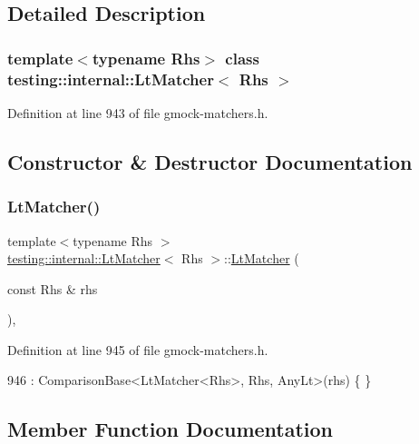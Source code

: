 \subsection{Detailed Description}
\subsubsection*{template$<$typename Rhs$>$\newline
class testing\+::internal\+::\+Lt\+Matcher$<$ Rhs $>$}



Definition at line 943 of file gmock-\/matchers.\+h.



\subsection{Constructor \& Destructor Documentation}
\mbox{\label{classtesting_1_1internal_1_1LtMatcher_af5275d78fc5499e4757f1b3ecca67e15}} 
\subsubsection{\texorpdfstring{Lt\+Matcher()}{LtMatcher()}}
{\footnotesize\ttfamily template$<$typename Rhs $>$ \\
\hyperlink{classtesting_1_1internal_1_1LtMatcher}{testing\+::internal\+::\+Lt\+Matcher}$<$ Rhs $>$\+::\hyperlink{classtesting_1_1internal_1_1LtMatcher}{Lt\+Matcher} (\begin{DoxyParamCaption}\item[{const Rhs \&}]{rhs }\end{DoxyParamCaption})\hspace{0.3cm}{\ttfamily [inline]}, {\ttfamily [explicit]}}



Definition at line 945 of file gmock-\/matchers.\+h.


\begin{DoxyCode}
946       : ComparisonBase<LtMatcher<Rhs>, Rhs, AnyLt>(rhs) \{ \}
\end{DoxyCode}


\subsection{Member Function Documentation}
\mbox{\label{classtesting_1_1internal_1_1LtMatcher_aeb101aafbf1c074ccbb3df1496487746}} 
